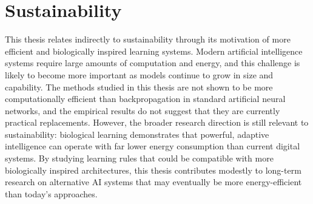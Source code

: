 \section{Sustainability}

This thesis relates indirectly to sustainability through its motivation of more efficient and biologically inspired learning systems. Modern artificial intelligence systems require large amounts of computation and energy, and this challenge is likely to become more important as models continue to grow in size and capability. The methods studied in this thesis are not shown to be more computationally efficient than backpropagation in standard artificial neural networks, and the empirical results do not suggest that they are currently practical replacements. However, the broader research direction is still relevant to sustainability: biological learning demonstrates that powerful, adaptive intelligence can operate with far lower energy consumption than current digital systems. By studying learning rules that could be compatible with more biologically inspired architectures, this thesis contributes modestly to long-term research on alternative AI systems that may eventually be more energy-efficient than today's approaches.
